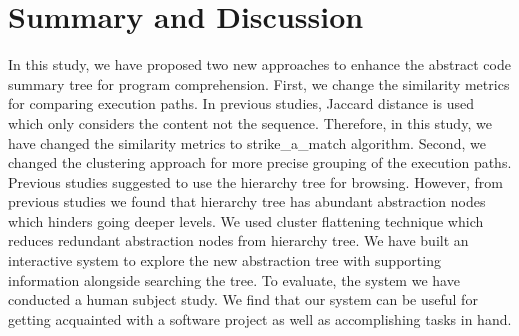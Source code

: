 \section{Summary and Discussion}
In this study, we have proposed two new approaches to enhance the abstract code summary tree for program comprehension. First, we change the similarity metrics for comparing execution paths. In previous studies, Jaccard distance is used which only considers the content not the sequence. Therefore, in this study, we have changed the similarity metrics to strike\_a\_match algorithm. Second, we changed the clustering approach for more precise grouping of the execution paths. Previous studies suggested to use the hierarchy tree for browsing. However, from previous studies we found that hierarchy tree has abundant abstraction nodes which hinders going deeper levels.
We used cluster flattening technique which reduces redundant abstraction nodes from hierarchy tree. We have built an interactive system to explore the new abstraction tree with supporting information alongside searching the tree. To evaluate, the system we have conducted a human subject study. We find that our system can be useful for getting acquainted with a software project as well as accomplishing tasks in hand.  
